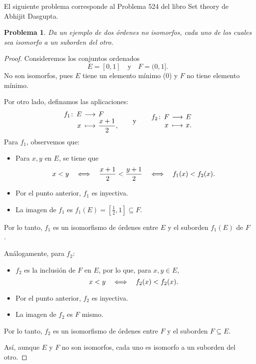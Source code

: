 \documentclass[a4,10pt]{aleph-notas}
\newtheorem*{prob}{Problema}
\begin{document}
\encabezado

\noindent
El siguiente problema corresponde al Problema 524 del libro Set theory de Abhijit Dasgupta.

\begin{prob}
    Da un ejemplo de dos órdenes no isomorfos, cada uno de los cuales sea isomorfo a un suborden del otro.
\end{prob}

\begin{proof}
    Consideremos los conjuntos ordenados
    \[
        E = [0,1] \quad \text{y} \quad F = (0,1].
    \]
    No son isomorfos, pues $E$ tiene un elemento mínimo ($0$) y $F$ no tiene elemento mínimo.

    Por otro lado, definamos las aplicaciones:
    \[
        \funcion{f_1}{E}{F}{x}{\frac{x+1}{2},}
        \qquad\text{y}\qquad
        \funcion{f_2}{F}{E}{x}{x.}
    \]
    Para $f_1$, observemos que:
    \begin{itemize}
        \item Para $x, y$ en $E$, se tiene que
        \[
            x < y
            \quad\Longleftrightarrow\quad
            \frac{x+1}{2} < \frac{y+1}{2}
            \quad\Longleftrightarrow\quad
            f_1(x) < f_2(x).
        \]
        \item Por el punto anterior, $f_1$ es inyectiva.
        \item La imagen de $f_1$ es $f_1(E) = \left[\frac{1}{2}, 1\right] \subseteq F$.
    \end{itemize}
    Por lo tanto, $f_1$ es un isomorfismo de órdenes entre $E$ y el suborden $f_1(E)$ de $F$.

    Análogamente, para $f_2$:
    \begin{itemize}
        \item $f_2$ es la inclusión de $F$ en $E$, por lo que, para $x,y\in E$,
        \[
            x < y
            \quad\Longleftrightarrow\quad
            f_2(x) < f_2(x).
        \]
        \item Por el punto anterior, $f_2$ es inyectiva.
        \item La imagen de $f_2$ es $F$ mismo.
    \end{itemize}
    Por lo tanto, $f_2$ es un isomorfismo de órdenes entre $F$ y el suborden $F \subseteq E$.

    Así, aunque $E$ y $F$ no son isomorfos, cada uno es isomorfo a un suborden del otro.
\end{proof}
\end{document}
